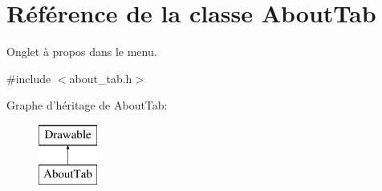 \hypertarget{class_about_tab}{\section{Référence de la classe About\+Tab}
\label{class_about_tab}
}


Onglet à propos dans le menu.  




{\ttfamily \#include $<$about\+\_\+tab.\+h$>$}

Graphe d'héritage de About\+Tab\+:\begin{figure}[H]
\begin{center}
\leavevmode
\includegraphics[height=2.000000cm]{class_about_tab}
\end{center}
\end{figure}
